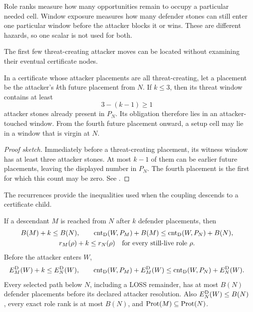 \begin{plainterms}
Role ranks measure how many opportunities remain to occupy a particular
needed cell.  Window exposure measures how many defender stones can still
enter one particular window before the attacker blocks it or wins.  These are
different hazards, so one scalar is not used for both.
\end{plainterms}

The first few threat-creating attacker moves can be located without examining
their eventual certificate nodes.

\begin{lemma}
\label{lem:L10}
In a certificate whose attacker placements are all threat-creating, let a
placement be the attacker's $k$th future placement from $N$.  If $k\le3$,
then its threat window contains at least
\[
  3-(k-1)\ge1
\]
attacker stones already present in $P_N$.  Its obligation therefore lies in
an attacker-touched window.  From the fourth future placement onward, a setup
cell may lie in a window that is virgin at $N$.
\end{lemma}

\begin{proof}[Proof sketch]
Immediately before a threat-creating placement, its witness window has at
least three attacker stones.  At most $k-1$ of them can be earlier future
placements, leaving the displayed number in $P_N$.  The fourth placement is
the first for which this count may be zero.  See
\cite{hexobot-companions}.
\end{proof}

The recurrences provide the inequalities used when the coupling descends to a
certificate child.

\begin{lemma}
\label{lem:L11}
If a descendant $M$ is reached from $N$ after $k$ defender placements, then
\[
\begin{gathered}
B(M)+k\le B(N),\qquad
\operatorname{cnt}_{\mathrm{D}}(W,P_M)+B(M)\le\operatorname{cnt}_{\mathrm{D}}(W,P_N)+B(N),\\
r_M(\rho)+k\le r_N(\rho)
\quad\text{for every still-live role }\rho.
\end{gathered}
\]
Before the attacker enters $W$,
\[
 E_M^{\mathrm{D}}(W)+k\le E_N^{\mathrm{D}}(W),\qquad
 \operatorname{cnt}_{\mathrm{D}}(W,P_M)+E_M^{\mathrm{D}}(W)
 \le\operatorname{cnt}_{\mathrm{D}}(W,P_N)+E_N^{\mathrm{D}}(W).
\]
Every selected path below $N$, including a LOSS remainder, has at most
$B(N)$ defender placements before its declared attacker resolution.  Also
$E_N^{\mathrm{D}}(W)\le B(N)$, every exact role rank is at most $B(N)$, and
$\operatorname{Prot}(M)\subseteq\operatorname{Prot}(N)$.
\end{lemma}

